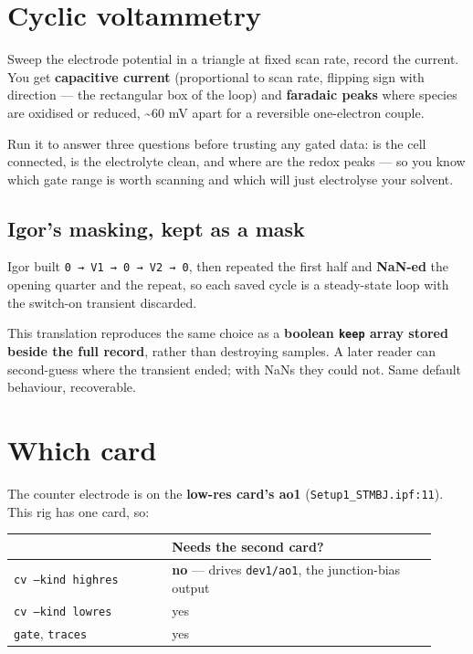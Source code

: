 \section{Cyclic voltammetry}

Sweep the electrode potential in a triangle at fixed scan rate, record the current. You get \textbf{capacitive current} (proportional to scan rate, flipping sign with direction --- the rectangular box of the loop) and \textbf{faradaic peaks} where species are oxidised or reduced, \textasciitilde{}60 mV apart for a reversible one-electron couple.

Run it to answer three questions before trusting any gated data: is the cell connected, is the electrolyte clean, and where are the redox peaks --- so you know which gate range is worth scanning and which will just electrolyse your solvent.

\subsection{Igor's masking, kept as a mask}

Igor built \texttt{0 → V1 → 0 → V2 → 0}, then repeated the first half and \textbf{NaN-ed} the opening quarter and the repeat, so each saved cycle is a steady-state loop with the switch-on transient discarded.

This translation reproduces the same choice as a \textbf{boolean \texttt{keep} array stored beside the full record}, rather than destroying samples. A later reader can second-guess where the transient ended; with NaNs they could not. Same default behaviour, recoverable.

\section{Which card}

The counter electrode is on the \textbf{low-res card's ao1} (\texttt{Setup1\_\discretionary{}{}{}STMBJ.\discretionary{}{}{}ipf:11}). This rig has one card, so:

\small\setlength{\LTleft}{0pt}\setlength{\LTright}{\fill}
\begin{longtable}{@{}>{\raggedright\arraybackslash}p{0.34\linewidth}>{\raggedright\arraybackslash}p{0.58\linewidth}@{}}
\toprule
\textbf{} & \textbf{Needs the second card?} \\
\midrule\endhead
\texttt{cv --kind highres} & \textbf{no} --- drives \texttt{dev1/\discretionary{}{}{}ao1}, the junction-bias output \\
\texttt{cv --kind lowres} & yes \\
\texttt{gate}, \texttt{traces} & yes \\
\bottomrule
\end{longtable}
\normalsize

